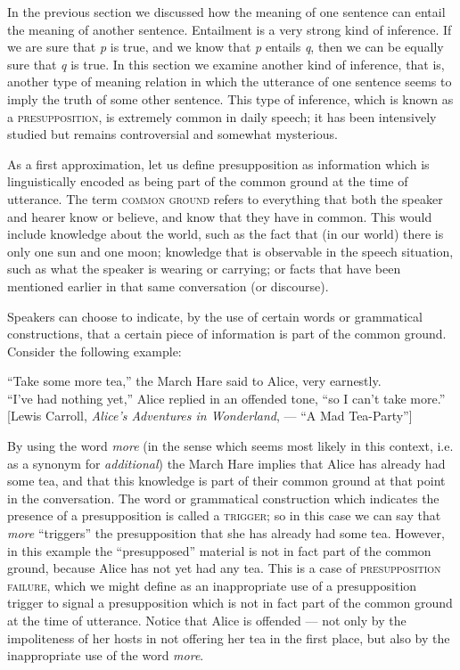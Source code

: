 In the previous section we discussed how the meaning of one sentence can entail the meaning of another sentence. Entailment is a very strong kind of inference. If we are sure that \textit{p} is true, and we know that \textit{p} entails \textit{q}, then we can be equally sure that \textit{q} is true. In this section we examine another kind of inference, that is, another type of meaning relation in which the utterance of one sentence seems to imply the truth of some other sentence. This type of inference, which is known as a \textsc{presupposition}, is extremely common in daily speech; it has been intensively studied but remains controversial and somewhat mysterious.



As a first approximation, let us define presupposition as information which is linguistically encoded as being part of the common ground at the time of utterance. The term \textsc{common ground} refers to everything that both the speaker and hearer know or believe, and know that they have in common. This would include knowledge about the world, such as the fact that (in our world) there is only one sun and one moon; knowledge that is observable in the speech situation, such as what the speaker is wearing or carrying; or facts that have been mentioned earlier in that same conversation (or discourse).



Speakers can choose to indicate, by the use of certain words or grammatical constructions, that a certain piece of information is part of the common ground. Consider the following example:


\ea
“Take some more tea,” the March Hare said to Alice, very earnestly.\\
“I’ve had nothing yet,” Alice replied in an offended tone, “so I can’t take more.”\\{}
{}[Lewis Carroll, \textit{Alice’s Adventures in Wonderland},  — “A Mad Tea-Party”]
\z


By using the word \textit{more} (in the sense which seems most likely in this context, i.e. as a synonym for \textit{additional}) the March Hare implies that Alice has already had some tea, and that this knowledge is part of their common ground at that point in the conversation. The word or grammatical construction which indicates the presence of a presupposition is called a \textsc{trigger}; so in this case we can say that \textit{more} “triggers” the presupposition that she has already had some tea. However, in this example the “presupposed” material is not in fact part of the common ground, because Alice has not yet had any tea. This is a case of \textsc{presupposition failure}, which we might define as an inappropriate use of a presupposition trigger to signal a presupposition which is not in fact part of the common ground at the time of utterance. Notice that Alice is offended — not only by the impoliteness of her hosts in not offering her tea in the first place, but also by the inappropriate use of the word \textit{more}.


